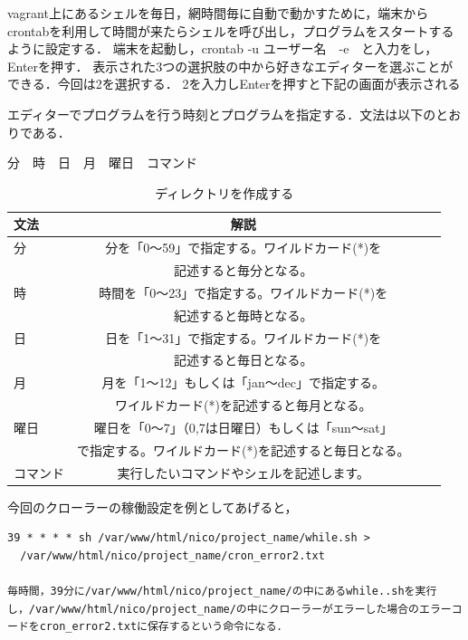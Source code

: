 \clearpage

vagrant上にあるシェルを毎日，網時間毎に自動で動かすために，端末からcrontabを利用して時間が来たらシェルを呼び出し，プログラムをスタートするように設定する．
端末を起動し，crontab -u ユーザー名　-e　と入力をし，Enterを押す．
表示された3つの選択肢の中から好きなエディターを選ぶことができる．今回は2を選択する．
2を入力しEnterを押すと下記の画面が表示される



エディターでプログラムを行う時刻とプログラムを指定する．文法は以下のとおりである．

分　時　日　月　曜日　コマンド

\begin{table}[htb]
	\begin{center}
		 \caption{ディレクトリを作成する}
		 \begin{tabular}{|l|c|r||r|} \hline
      文法 & 解説   \\ \hline \hline
分　& 分を「0～59」で指定する。ワイルドカード(*)を \\
	& 記述すると毎分となる。 \\ \hline
時 & 時間を「0～23」で指定する。ワイルドカード(*)を\\
	& 紀述すると毎時となる。 \\ \hline
日 & 日を「1～31」で指定する。ワイルドカード(*)を\\
	& 記述すると毎日となる。 \\ \hline
月 & 月を「1～12」もしくは「jan～dec」で指定する。\\
	& ワイルドカード(*)を記述すると毎月となる。 \\ \hline
曜日 & 曜日を「0～7」（0,7は日曜日）もしくは「sun～sat」\\
	 &で指定する。ワイルドカード(*)を記述すると毎日となる。 \\ \hline
コマンド & 実行したいコマンドやシェルを記述します。 \\ \hline
			\end{tabular}
	 \end{center}
\end{table}

今回のクローラーの稼働設定を例としてあげると，
\begin{verbatim}
39 * * * * sh /var/www/html/nico/project_name/while.sh >
  /var/www/html/nico/project_name/cron_error2.txt

毎時間，39分に/var/www/html/nico/project_name/の中にあるwhile..shを実行し，/var/www/html/nico/project_name/の中にクローラーがエラーした場合のエラーコードをcron_error2.txtに保存するという命令になる．
\end{verbatim}

